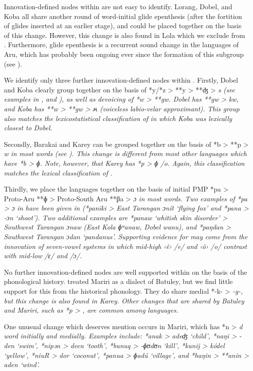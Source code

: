 Innovation-defined nodes within  are not easy to identify.
Lorang, Dobel, and Koba all share another round of word-initial
glide epenthesis (after the fortition of glides inserted at an
earlier stage), and could be placed together on the basis of this change.
However, this change is also found in Lola which we exclude from .
Furthermore, glide epenthesis is a recurrent sound change in
the languages of Aru, which has probably been ongoing ever since
the formation of this subgroup (see ).

We identify only three further innovation-defined nodes within .
Firstly, Dobel and Koba clearly group together on the basis of
*y/*z > **y > **ʤ > \it{s} (see examples in ,
and ), as well as devoicing of *w > **gw.
Dobel has **gw > \it{kw},
and Koba has **w > **gw > \it{ʍ} (voiceless labio-velar approximant).
This group also matches the lexicostatistical classification
of \citet{Hughes1987} in which Koba was lexically closest to Dobel.

Secondly, Barakai and Karey can be grouped together on the basis
of *b > **p > \it{w} in most words (see ).
This change is different from most other  languages
which have *b > \it{ɸ.} Note,
however, that Karey has *p > \it{ɸ} /{\gap}o.
Again, this classification matches the lexical classification of \citet{Hughes1987}.

Thirdly, we place the  languages together on the
basis of initial PMP *pa > Proto-Aru **ɸ > Proto-South Aru **βa
> \it{ɔ} in most words.
Two examples of *pa > \it{ɔ} in  have been given
in  (*paniki > East Tarangan \it{ɔnít} ‘flying fox’
and *pana >  \it{-ɔn} ‘shoot’).
Two additional examples are *panaw ‘whitish skin disorder’ >
Southwest Tarangan \it{ɔnaw} (East Kola \it{ɸʷanaw},
Dobel \it{wanu}), and *paŋdan > Southwest Tarangan \it{ɔdan} ‘pandanus’.
Supporting evidence for  may come from
the innovation of seven-vowel systems in which mid-high ‹ê›
/e/ and ‹ô› /o/ contrast with mid-low /ɛ/ and /ɔ/.

No further innovation-defined nodes are well supported within
 on the basis of the phonological history.
\citet{Hughes1987} treated Mariri as a dialect of Batuley,
but we find little support for this from the historical phonology.
They do share medial *-k- > \it{-g-},
but this change is also found in Karey.
Other changes that are shared by Batuley
and Mariri, such as *p > {\0},
are common among  languages.

One unusual change which deserves mention occurs in Mariri,
which has *n > \it{d} word initially and medially.
Examples include: *anak > \it{adeʤ} ‘child’,
*naŋi > \it{-den} ‘swim’,
*nipən > \it{deen} ‘tooth’,
*bunuq > \it{-ɸʊdʊn} ‘kill’,
*kunij > \it{kódel} ‘yellow’,
*niuR > \it{dor} ‘coconut’,
*panua > \it{ɸadú} ‘village’,
and *haŋin > **anin > \it{aden} ‘wind’.

